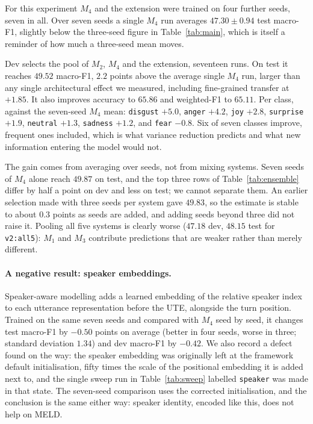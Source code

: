 \documentclass[sigconf,nonacm]{acmart}
\begin{document}
For this experiment $M_4$ and the extension were trained on four further seeds, seven in
all. Over seven seeds a single $M_4$ run averages $47.30 \pm 0.94$ test macro-F1, slightly
below the three-seed figure in Table~\ref{tab:main}, which is itself a reminder of how much
a three-seed mean moves.

Dev selects the pool of $M_2$, $M_4$ and the extension, seventeen runs. On test it reaches
$49.52$ macro-F1, $2.2$ points above the average single $M_4$ run, larger than any single
architectural effect we measured, including fine-grained transfer at $+1.85$. It also
improves accuracy to $65.86$ and weighted-F1 to $65.11$. Per class, against the seven-seed
$M_4$ mean: \texttt{disgust} $+5.0$, \texttt{anger} $+4.2$, \texttt{joy} $+2.8$,
\texttt{surprise} $+1.9$, \texttt{neutral} $+1.3$, \texttt{sadness} $+1.2$, and
\texttt{fear} $-0.8$. Six of seven classes improve, frequent ones included, which is what
variance reduction predicts and what new information entering the model would not.

The gain comes from averaging over seeds, not from mixing systems. Seven seeds of $M_4$
alone reach $49.87$ on test, and the top three rows of Table~\ref{tab:ensemble} differ by
half a point on dev and less on test; we cannot separate them. An earlier selection made
with three seeds per system gave $49.83$, so the estimate is stable to about $0.3$ points
as seeds are added, and adding seeds beyond three did not raise it. Pooling all five
systems is clearly worse ($47.18$ dev, $48.15$ test for \texttt{v2:all5}): $M_1$ and
$M_3$ contribute predictions that are weaker rather than merely different.

\paragraph{A negative result: speaker embeddings.}
Speaker-aware modelling adds a learned embedding of the relative speaker index to each
utterance representation before the UTE, alongside the turn position. Trained on the same
seven seeds and compared with $M_4$ seed by seed, it changes test macro-F1 by $-0.50$
points on average (better in four seeds, worse in three; standard deviation $1.34$) and dev
macro-F1 by $-0.42$. We also record a defect found on the way: the speaker embedding was
originally left at the framework default initialisation, fifty times the scale of the
positional embedding it is added next to, and the single sweep run in
Table~\ref{tab:sweep} labelled \texttt{speaker} was made in that state. The seven-seed
comparison uses the corrected initialisation, and the conclusion is the same either way:
speaker identity, encoded like this, does not help on MELD.
\end{document}
